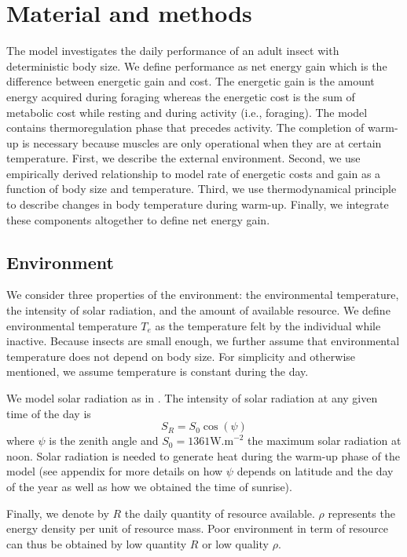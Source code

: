 \section*{Material and methods}
The model investigates the daily performance of an adult insect with deterministic body size.
We define performance as net energy gain which is the difference between energetic gain and cost.
The energetic gain is the amount energy acquired during foraging whereas  the energetic cost is the sum of metabolic cost while resting and during activity (i.e., foraging).
The model contains thermoregulation phase that precedes activity.
The completion of warm-up is necessary because muscles are only operational when they are at certain temperature. 
First, we describe the external environment.
Second, we use empirically derived relationship to model rate of energetic costs and gain as a function of body size and temperature.
Third, we use thermodynamical principle to describe changes in body temperature during warm-up.
Finally, we integrate these components altogether to define net energy gain. 

\subsection*{Environment}
We consider three properties of the environment: the environmental temperature, the intensity of solar radiation, and the amount of available resource.
We define environmental temperature $T_e$ as the temperature felt by the individual while inactive.
Because insects are small enough, we further assume that environmental temperature does not depend on body size.
For simplicity and otherwise mentioned, we assume temperature is constant during the day.

We model solar radiation as in \citet{Campbell2012}.
The intensity of solar radiation at any given time of the day is \[S_R = S_0 \cos(\psi) \]
where $\psi$ is the zenith angle and $S_0 = 1361 \mbox{W.m}^{-2}$ the maximum solar radiation at noon.
Solar radiation is needed to generate heat during the warm-up phase of the model (see appendix for more details on how $\psi$ depends on latitude and the day of the year as well as how we obtained the time of sunrise).

Finally, we denote by $R$ the daily quantity of resource available.
$\rho$ represents the energy density per unit of resource mass. 
Poor environment in term of resource can thus be obtained by low quantity $R$ or low quality $\rho$.

